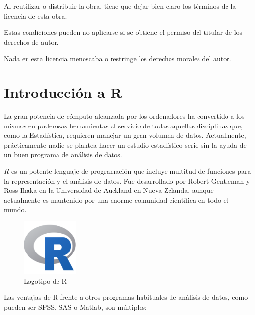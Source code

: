 \documentclass[
  a4paper,
]{scrreport}
\theoremstyle{definition}
\theoremstyle{remark}
\begin{document}
Al reutilizar o distribuir la obra, tiene que dejar bien claro los
términos de la licencia de esta obra.

Estas condiciones pueden no aplicarse si se obtiene el permiso del
titular de los derechos de autor.

Nada en esta licencia menoscaba o restringe los derechos morales del
autor.


\chapter{Introducción a R}\label{introducciuxf3n-a-r}

La gran potencia de cómputo alcanzada por los ordenadores ha convertido
a los mismos en poderosas herramientas al servicio de todas aquellas
disciplinas que, como la Estadística, requieren manejar un gran volumen
de datos. Actualmente, prácticamente nadie se plantea hacer un estudio
estadístico serio sin la ayuda de un buen programa de análisis de datos.

\emph{R} es un potente lenguaje de programación que incluye multitud de
funciones para la representación y el análisis de datos. Fue
desarrollado por Robert Gentleman y Ross Ihaka en la Universidad de
Auckland en Nueva Zelanda, aunque actualmente es mantenido por una
enorme comunidad científica en todo el mundo.

\begin{figure}[H]

{\centering \includegraphics[width=0.25\textwidth,height=\textheight]{img/logos/Rlogo.png}

}

\caption{Logotipo de R}

\end{figure}%

Las ventajas de R frente a otros programas habituales de análisis de
datos, como pueden ser SPSS, SAS o Matlab, son múltiples:
\end{document}
